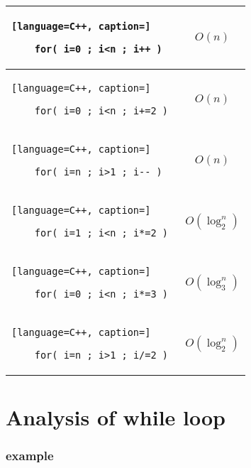 \documentclass[12pt]{article}
\begin{document}
\begin{center}
  \bgroup
  \def\arraystretch{1.5}%
  \begin{tabular}{ E  C  }
	\begin{lstlisting}[language=C++, caption=]
	
	for( i=0 ; i<n ; i++ ) 
	\end{lstlisting}
     &
     { \Large  
	$O(n)$
	}
	\\ \hline
	\begin{lstlisting}[language=C++, caption=]
	
	for( i=0 ; i<n ; i+=2 ) 
	\end{lstlisting}
     &  
     { \Large  
	$O(n)$
	}
	\\ \hline
	\begin{lstlisting}[language=C++, caption=]
	
	for( i=n ; i>1 ; i-- ) 
	\end{lstlisting}
     &  
     { \Large  
	$O(n)$
	}
	\\ \hline
	\begin{lstlisting}[language=C++, caption=]
	
	for( i=1 ; i<n ; i*=2 ) 
	\end{lstlisting}
     &  
     { \Large  
	$O(\log^{n}_{2})$
	}
	\\ \hline
	\begin{lstlisting}[language=C++, caption=]
	
	for( i=0 ; i<n ; i*=3 ) 
	\end{lstlisting}
     &  
     { \Large  
	$O(\log^{n}_{3})$
	}
	\\ \hline
	\begin{lstlisting}[language=C++, caption=]
	
	for( i=n ; i>1 ; i/=2 ) 
	\end{lstlisting}
     &  
     { \Large  
	$O(\log^{n}_{2})$
	}
	\\ 
  \end{tabular}
  \egroup
\end{center}





\section{Analysis of while loop}


\subsubsection{example}
\end{document}

